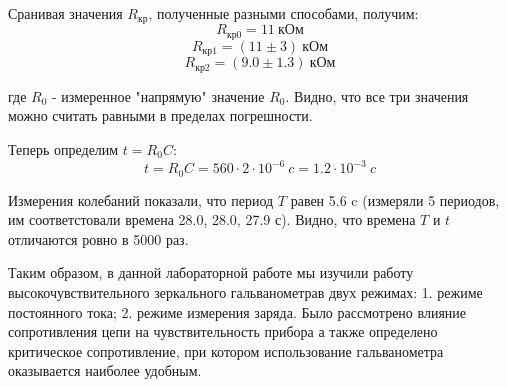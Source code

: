 \documentclass[14pt]{article}
\begin{document}
\vspace{2cm}
Сранивая значения $R_\text{кр}$, полученные разными способами, получим:
$$
	R_\text{кр0} = 11~\text{кОм}
$$
$$
	R_\text{кр1} = (11 \pm 3)~\text{кОм}
$$
$$
	R_\text{кр2} = (9.0 \pm 1.3)~\text{кОм}
$$

где $R_0$ - измеренное "напрямую" значение $R_0$. Видно, что все три значения можно считать равными в пределах погрешности.

\vspace{1cm}
Теперь определим $t = R_0C$:
$$
	t = R_0C = 560\cdot2\cdot10^{-6}~c = 1.2\cdot10^{-3}~c
$$

Измерения колебаний показали, что период $T$ равен 5.6 c (измеряли 5 периодов, им соответстовали времена 28.0, 28.0, 27.9 с). Видно, что времена $T$ и $t$ отличаются ровно в 5000 раз.

\newpage
Таким образом, в данной лабораторной работе мы изучили работу высокочувствительного зеркального гальванометрав двух режимах: 1. режиме постоянного тока; 2. режиме измерения заряда. Было рассмотрено влияние сопротивления цепи на чувствительность прибора а также определено критическое сопротивление, при котором использование гальванометра оказывается наиболее удобным.
\end{document}
